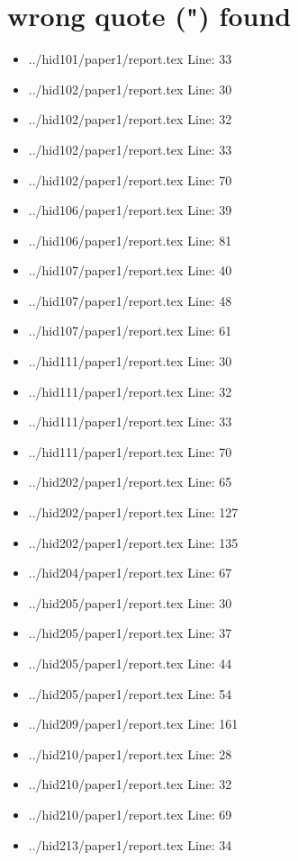 \section{wrong quote (") found}\label{wrong-quote-found}

\begin{itemize}
\tightlist
\item
  ../hid101/paper1/report.tex Line: 33
\item
  ../hid102/paper1/report.tex Line: 30
\item
  ../hid102/paper1/report.tex Line: 32
\item
  ../hid102/paper1/report.tex Line: 33
\item
  ../hid102/paper1/report.tex Line: 70
\item
  ../hid106/paper1/report.tex Line: 39
\item
  ../hid106/paper1/report.tex Line: 81
\item
  ../hid107/paper1/report.tex Line: 40
\item
  ../hid107/paper1/report.tex Line: 48
\item
  ../hid107/paper1/report.tex Line: 61
\item
  ../hid111/paper1/report.tex Line: 30
\item
  ../hid111/paper1/report.tex Line: 32
\item
  ../hid111/paper1/report.tex Line: 33
\item
  ../hid111/paper1/report.tex Line: 70
\item
  ../hid202/paper1/report.tex Line: 65
\item
  ../hid202/paper1/report.tex Line: 127
\item
  ../hid202/paper1/report.tex Line: 135
\item
  ../hid204/paper1/report.tex Line: 67
\item
  ../hid205/paper1/report.tex Line: 30
\item
  ../hid205/paper1/report.tex Line: 37
\item
  ../hid205/paper1/report.tex Line: 44
\item
  ../hid205/paper1/report.tex Line: 54
\item
  ../hid209/paper1/report.tex Line: 161
\item
  ../hid210/paper1/report.tex Line: 28
\item
  ../hid210/paper1/report.tex Line: 32
\item
  ../hid210/paper1/report.tex Line: 69
\item
  ../hid213/paper1/report.tex Line: 34

\end{itemize}
